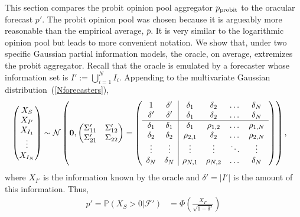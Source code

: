\documentclass[11pt]{article}
\renewcommand{\P}{\mathbb{P}}
\theoremstyle{definition}
\theoremstyle{definition}
\def\P{{\mathbb P}}
\def\probit{p_{\rm probit}}
\begin{document}
This section compares the probit opinion pool aggregator $\probit$ 
to the oracular forecast $p'$. The probit opinion pool was chosen because it is argueably more reasonable than the empirical average, $\bar{p}$. It is very similar to the logarithmic opinion pool but leads to more convenient notation. We show that, under two specific Gaussian partial 
information models, the oracle, on average,
extremizes the probit aggregator.  Recall that the oracle is emulated
by a forecaster whose information set is $I' := \bigcup_{i=1}^N I_i$.
Appending to the multivariate Gaussian distribution~(\ref{Nforecasters}),
\begin{align}
\left(\begin{matrix} X_S \\ X_{I'} \\ X_{I_1}\\ \vdots \\ X_{I_N} 
 \end{matrix}\right) &\sim \mathcal{N}\left( 
 \boldsymbol{0}, \left(\begin{matrix} 
\Sigma_{11}' & \Sigma_{12}'\\
\Sigma_{21}' & \Sigma_{22}\\
 \end{matrix}\right) 
 =
 \left(\begin{array}{c c| c c cc }
1 & \delta' & \delta_1 & \delta_2 & \dots & \delta_N  \\ 
\delta' & \delta' & \delta_1 & \delta_2 & \dots & \delta_N  \\ \hline
\delta_1& \delta_1 & \delta_1 &\rho_{1,2} & \dots & \rho_{1,N}   \\ 
\delta_2 & \delta_2 &\rho_{2,1} & \delta_2 & \dots & \rho_{2,N}  \\ 
\vdots &\vdots & \vdots & \vdots & \ddots & \vdots  \\ 
\delta_N &\delta_N & \rho_{N,1} & \rho_{N,2} & \dots & \delta_N\\ 
 \end{array}\right)\right), \label{oracleN} 
\end{align}
where  $X_{I'}$  is the information known by the oracle and $\delta' = |I'|$ is the amount of this information.  Thus,
 \begin{align*}
p' = \P(X_S > 0 |  \mathcal{F}') 
   &= \Phi\left( \frac{X_{I'}}{\sqrt{1-\delta'}} \right)
\end{align*}
\end{document}
